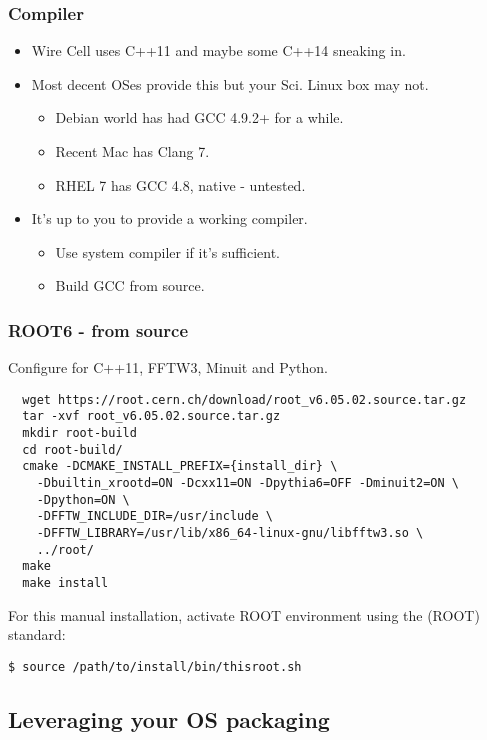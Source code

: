 \documentclass[xcolor=dvipsnames]{beamer}
\begin{document}
\begin{frame}
  \frametitle{Compiler}
  \begin{itemize}
  \item Wire Cell uses C++11 and maybe some C++14 sneaking in. 
  \item Most decent OSes provide this but your Sci. Linux box may not.
    \begin{itemize}
    \item Debian world has had GCC 4.9.2+ for a while.
    \item Recent Mac has Clang 7.
    \item RHEL 7 has GCC 4.8, native - untested.
    \end{itemize}
  \item It's up to you to provide a working compiler.
    \begin{itemize}
    \item Use system compiler if it's sufficient.
    \item Build GCC from source.
    \end{itemize}
  \end{itemize}
\end{frame}

\begin{frame}[fragile]
  \frametitle{ROOT6 - from source}
  Configure for C++11, FFTW3, Minuit and Python.

\scriptsize
\begin{verbatim}
  wget https://root.cern.ch/download/root_v6.05.02.source.tar.gz
  tar -xvf root_v6.05.02.source.tar.gz
  mkdir root-build
  cd root-build/
  cmake -DCMAKE_INSTALL_PREFIX={install_dir} \
	-Dbuiltin_xrootd=ON -Dcxx11=ON -Dpythia6=OFF -Dminuit2=ON \
	-Dpython=ON \
	-DFFTW_INCLUDE_DIR=/usr/include \
	-DFFTW_LIBRARY=/usr/lib/x86_64-linux-gnu/libfftw3.so \
	../root/
  make
  make install
\end{verbatim}

\small
For this manual installation, activate ROOT environment using the (ROOT) standard:

\begin{verbatim}
$ source /path/to/install/bin/thisroot.sh
\end{verbatim}

\end{frame}

\subsection{Leveraging your OS packaging}
\end{document}
